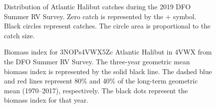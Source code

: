 \documentclass[11pt]{book}
\begin{document}
\begin{figure}[htb]

{\centering {} 

}

\caption{Distribution of Atlantic Halibut catches during the 2019 DFO Summer RV Survey. Zero catch is represented by the + symbol. Black circles represent catches. The circle area is proportional to the catch size.}\label{fig:42-map-halibut}
\end{figure}

\begin{figure}[htb]

{\centering {} 

}

\caption{Biomass index for 3NOPs4VWX5Zc Atlantic Halibut in 4VWX from the DFO Summer RV Survey. The three-year geometric mean biomass index is represented by the solid black line. The dashed blue and red lines represent 80\% and 40\% of the long-term geometric mean (1970--2017), respectively. The black dots represent the biomass index for that year.}\label{fig:43-fig-halibut-biomass}
\end{figure}
\end{document}

